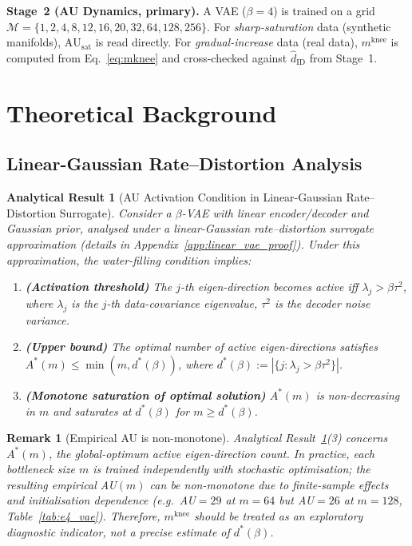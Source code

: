 \documentclass[11pt,a4paper]{article}
\newtheorem{analytical}[theorem]{Analytical Result}
\newtheorem{remark}{Remark}
\newcommand{\AUsat}{\mathrm{AU}_{\mathrm{sat}}}
\newcommand{\mknee}{m^{\mathrm{knee}}}
\newcommand{\hatdID}{\hat{d}_{\mathrm{ID}}}
\begin{document}
\textbf{Stage~2 (AU Dynamics, primary).}
A VAE ($\beta=4$) is trained on a grid
$\mathcal{M}=\{1,2,4,8,12,16,20,32,64,128,256\}$.
For \emph{sharp-saturation} data (synthetic manifolds), $\AUsat$ is read directly.
For \emph{gradual-increase} data (real data), $\mknee$ is computed from
Eq.~\eqref{eq:mknee} and cross-checked against $\hatdID$ from Stage~1.

\section{Theoretical Background}\label{sec:theory}

\subsection{Linear-Gaussian Rate--Distortion Analysis}
\label{sec:theory_lva}

\begin{analytical}[AU Activation Condition in Linear-Gaussian Rate--Distortion Surrogate]
\label{ar:lva}
Consider a $\beta$-VAE with linear encoder/decoder and Gaussian prior, analysed
under a linear-Gaussian rate--distortion surrogate approximation
(details in Appendix~\ref{app:linear_vae_proof}).
Under this approximation, the water-filling condition implies:
\begin{enumerate}
\item \textbf{(Activation threshold)} The $j$-th eigen-direction becomes active iff
  $\lambda_j>\beta\tau^2$,
  where $\lambda_j$ is the $j$-th data-covariance eigenvalue, $\tau^2$ is the decoder noise variance.
\item \textbf{(Upper bound)} The optimal number of active eigen-directions satisfies
  $A^*(m)\leq\min(m,d^*(\beta))$, where $d^*(\beta):=|\{j:\lambda_j>\beta\tau^2\}|$.
\item \textbf{(Monotone saturation of optimal solution)}
  $A^*(m)$ is non-decreasing in $m$ and saturates at $d^*(\beta)$ for $m\geq d^*(\beta)$.
\end{enumerate}
\end{analytical}

\begin{remark}[Empirical AU is non-monotone]
Analytical Result~\ref{ar:lva}(3) concerns $A^*(m)$, the global-optimum active
eigen-direction count.  In practice, each bottleneck size $m$ is trained
independently with stochastic optimisation; the resulting empirical AU$(m)$ can
be non-monotone due to finite-sample effects and initialisation dependence
(e.g.\ AU$=29$ at $m=64$ but AU$=26$ at $m=128$, Table~\ref{tab:e4_vae}).
Therefore, $\mknee$ should be treated as an exploratory diagnostic indicator,
not a precise estimate of $d^*(\beta)$.
\end{remark}
\end{document}
